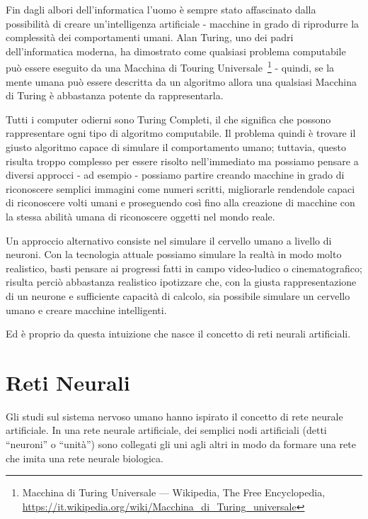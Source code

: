 \nocite{Lipton:2009}

Fin dagli albori dell'informatica l'uomo \`e sempre stato affascinato dalla
possibilit\`a di creare un'intelligenza artificiale - macchine in grado di
riprodurre la complessit\`a dei comportamenti umani. Alan Turing, uno dei padri
dell'informatica moderna, ha dimostrato come qualsiasi problema computabile pu\`o
essere eseguito da una Macchina di Touring Universale~\footnote{Macchina di Turing
Universale --- Wikipedia, The Free Encyclopedia,
\url{https://it.wikipedia.org/wiki/Macchina_di_Turing_universale} } - quindi, se
la mente umana pu\`o essere descritta da un algoritmo allora una qualsiasi Macchina
di Turing \`e abbastanza potente da rappresentarla.

Tutti i computer odierni sono Turing Completi, il che significa che possono
rappresentare ogni tipo di algoritmo computabile. Il problema quindi \`e trovare
il giusto algoritmo capace di simulare il comportamento umano; tuttavia, questo
risulta troppo complesso per essere risolto nell'immediato ma possiamo pensare a
diversi approcci - ad esempio - possiamo partire creando macchine in grado di
riconoscere semplici immagini come numeri scritti, migliorarle rendendole capaci
di riconoscere volti umani e proseguendo cos\`i fino alla creazione di macchine
con la stessa abilit\`a umana di riconoscere oggetti nel mondo reale.

Un approccio alternativo consiste nel simulare il cervello umano a livello di neuroni.
Con la tecnologia attuale possiamo simulare la realt\`a in modo molto realistico,
basti pensare ai progressi fatti in campo video-ludico o cinematografico; risulta
perci\`o abbastanza realistico ipotizzare che, con la giusta rappresentazione di
un neurone e sufficiente capacit\`a di calcolo, sia possibile simulare un cervello
umano e creare macchine intelligenti.

Ed \`e proprio da questa intuizione che nasce il concetto di reti neurali artificiali.

\section{Reti Neurali}

Gli studi sul sistema nervoso umano hanno ispirato il concetto di rete neurale
artificiale. In una rete neurale artificiale, dei semplici nodi artificiali
(detti ``neuroni'' o ``unit\`a'') sono collegati gli uni agli altri in modo da formare
una rete che imita una rete neurale biologica.

